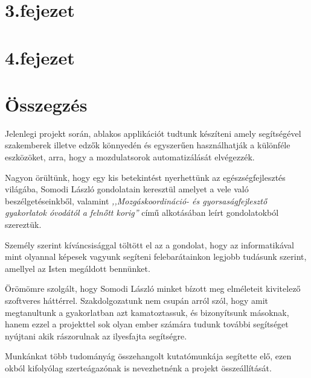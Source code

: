 \documentclass[tocnopagenum]{thesis-ekf}
\theoremstyle{definition}
\theoremstyle{remark}
\begin{document}
	\chapter*{3.fejezet}

	\chapter*{4.fejezet}

	\chapter*{Összegzés}
	Jelenlegi projekt során, ablakos applikációt tudtunk készíteni amely segítségével szakemberek illetve edzők könnyedén és egyszerűen használhatják a különféle eszközöket, arra, hogy a mozdulatsorok automatizálását elvégezzék.

	Nagyon örültünk, hogy egy kis betekintést nyerhettünk az egészségfejlesztés világába, Somodi László gondolatain keresztül amelyet a vele való beszélgetéseinkből, valamint \textit{,,Mozgáskoordináció- és gyorsaságfejlesztő gyakorlatok óvodától a felnőtt korig''} című alkotásában leírt gondolatokból szereztük.
	
	Személy szerint kíváncsisággal töltött el az a gondolat, hogy az informatikával mint olyannal képesek vagyunk segíteni felebarátainkon legjobb tudásunk szerint, amellyel az Isten megáldott bennünket.
	
	Örömömre szolgált, hogy Somodi László minket bízott meg elméleteit kivitelező szoftveres háttérrel. Szakdolgozatunk nem csupán arról szól, hogy amit megtanultunk a gyakorlatban azt kamatoztassuk, és bizonyítsunk másoknak, hanem ezzel a projekttel sok olyan ember számára tudunk további segítséget nyújtani akik rászorulnak az ilyesfajta segítségre.
	
	Munkánkat több tudományág összehangolt kutatómunkája segítette elő, ezen okból kifolyólag szerteágazónak is nevezhetnénk a projekt összeállítását.
	
\end{document}
